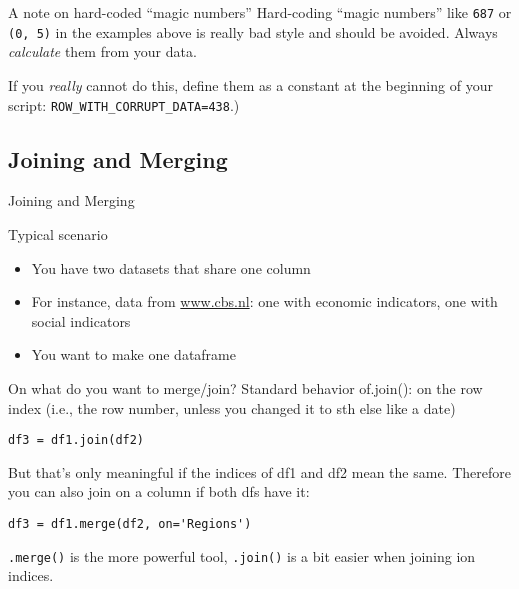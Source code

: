 \documentclass[compress]{beamer}
\begin{document}
\begin{frame}{A note on hard-coded ``magic numbers'' }
	Hard-coding ``magic numbers'' like \texttt{687} or \texttt{(0, 5)} in the examples above is really bad style and should be avoided. Always \emph{calculate} them from your data.
	
	If you \emph{really} cannot do this, define them as a constant at the beginning of your script: \texttt{ROW\_WITH\_CORRUPT\_DATA=438}.)
\end{frame}



\subsection{Joining and Merging}

\begin{frame}{Joining and Merging}
\begin{block}{Typical scenario}
	\begin{itemize}
		\item You have two datasets that share one column
		\item For instance, data from \url{www.cbs.nl}: one with economic indicators, one with social indicators
		\item You want to make one dataframe
	\end{itemize}
\end{block}
\end{frame}




{
	\begin{frame}[plain]
\end{frame}
	\begin{frame}[plain]
\end{frame}
}

\begin{frame}[fragile]{On what do you want to merge/join?}
Standard behavior of.join(): on the row index  (i.e., the row number, unless
you changed it to sth else like a date)
\begin{lstlisting}
df3 = df1.join(df2)
\end{lstlisting}
\pause
But that’s only meaningful if the indices of df1 and df2 mean the same. Therefore you can also join on a column if both dfs have it:
\begin{lstlisting}
df3 = df1.merge(df2, on='Regions')
\end{lstlisting}
\pause
\texttt{.merge()} is the more powerful tool, \texttt{.join()} is a bit easier when joining ion indices.
\end{frame}
\end{document}

